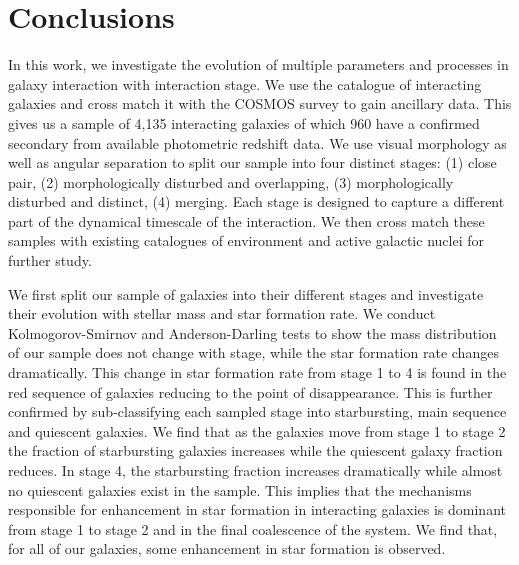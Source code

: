 \documentclass[fleqn,usenatbib]{mnras}
\begin{document}
\section{Conclusions}\label{conclusion}
\noindent In this work, we investigate the evolution of multiple parameters and processes in galaxy interaction with interaction stage. We use the \citet{2023ApJ...948...40O} catalogue of interacting galaxies and cross match it with the COSMOS survey to gain ancillary data. This gives us a sample of 4,135 interacting galaxies of which 960 have a confirmed secondary from available photometric redshift data. We use visual morphology as well as angular separation to split our sample into four distinct stages: (1) close pair, (2) morphologically disturbed and overlapping, (3) morphologically disturbed and distinct, (4) merging. Each stage is designed to capture a different part of the dynamical timescale of the interaction. We then cross match these samples with existing catalogues of environment and active galactic nuclei for further study.

We first split our sample of galaxies into their different stages and investigate their evolution with stellar mass and star formation rate. We conduct Kolmogorov-Smirnov and Anderson-Darling tests to show the mass distribution of our sample does not change with stage, while the star formation rate changes dramatically. This change in star formation rate from stage 1 to 4 is found in the red sequence of galaxies reducing to the point of disappearance. This is further confirmed by sub-classifying each sampled stage into starbursting, main sequence and quiescent galaxies. We find that as the galaxies move from stage 1 to stage 2 the fraction of starbursting galaxies increases while the quiescent galaxy fraction reduces. In stage 4, the starbursting fraction increases dramatically while almost no quiescent galaxies exist in the sample. This implies that the mechanisms responsible for enhancement in star formation in interacting galaxies is dominant from stage 1 to stage 2 and in the final coalescence of the system. We find that, for all of our galaxies, some enhancement in star formation is observed. 
\end{document}
